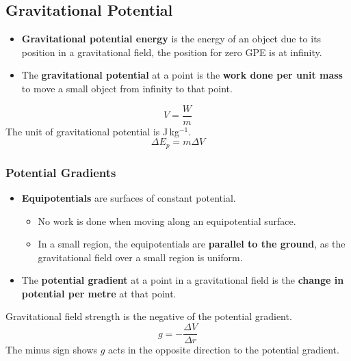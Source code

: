 \subsection{Gravitational Potential}

\begin{itemize}
    \item \textbf{Gravitational potential energy} is the energy of an object due to its position in a gravitational field, the position for zero GPE is at infinity.
    \item The \textbf{gravitational potential} at a point is the \textbf{work done per unit mass} to move a small object from infinity to that point.
\end{itemize}
$$V=\frac{W}{m}$$
The unit of gravitational potential is J\,kg$^{-1}$.
$$\Delta E_p=m\Delta V$$

\subsubsection*{Potential Gradients}

\begin{itemize}
    \item \textbf{Equipotentials} are surfaces of constant potential.
        \begin{itemize}
            \item No work is done when moving along an equipotential surface.
            \item In a small region, the equipotentials are \textbf{parallel to the ground}, as the gravitational field over a small region is uniform.
        \end{itemize}
    \item The \textbf{potential gradient} at a point in a gravitational field is the \textbf{change in potential per metre} at that point.
\end{itemize}

Gravitational field strength is the negative of the potential gradient.
$$g=-\frac{\Delta V}{\Delta r}$$
The minus sign shows $g$ acts in the opposite direction to the potential gradient.
